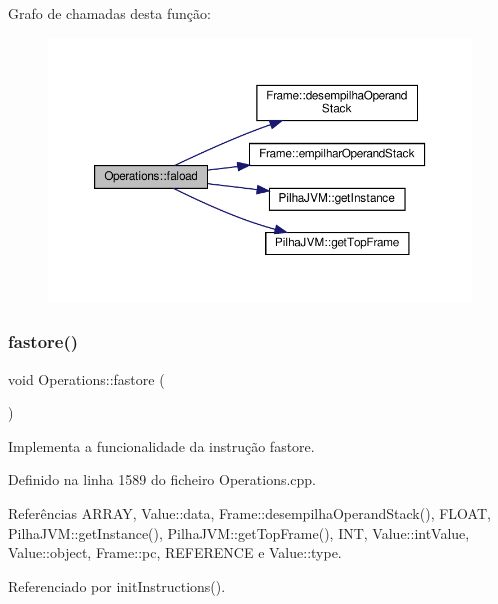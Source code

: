 Grafo de chamadas desta função\+:\nopagebreak
\begin{figure}[H]
\begin{center}
\leavevmode
\includegraphics[width=350pt]{classOperations_ac22c02d88fa894cafd3f53c54d91409d_cgraph}
\end{center}
\end{figure}
\mbox{\label{classOperations_aa8a2c3048379b9d5cdc2b4611ef86190}} 
\subsubsection{\texorpdfstring{fastore()}{fastore()}}
{\footnotesize\ttfamily void Operations\+::fastore (\begin{DoxyParamCaption}{ }\end{DoxyParamCaption})\hspace{0.3cm}{\ttfamily [private]}}



Implementa a funcionalidade da instrução fastore. 



Definido na linha 1589 do ficheiro Operations.\+cpp.



Referências A\+R\+R\+AY, Value\+::data, Frame\+::desempilha\+Operand\+Stack(), F\+L\+O\+AT, Pilha\+J\+V\+M\+::get\+Instance(), Pilha\+J\+V\+M\+::get\+Top\+Frame(), I\+NT, Value\+::int\+Value, Value\+::object, Frame\+::pc, R\+E\+F\+E\+R\+E\+N\+CE e Value\+::type.



Referenciado por init\+Instructions().

